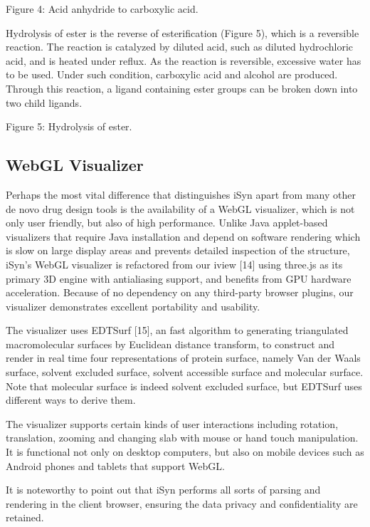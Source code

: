 Figure 4: Acid anhydride to carboxylic acid.

Hydrolysis of ester is the reverse of esterification (Figure 5), which is a reversible reaction. The reaction is catalyzed by diluted acid, such as diluted hydrochloric acid, and is heated under reflux. As the reaction is reversible, excessive water has to be used. Under such condition, carboxylic acid and alcohol are produced. Through this reaction, a ligand containing ester groups can be broken down into two child ligands.

Figure 5: Hydrolysis of ester.

\subsection{WebGL Visualizer}

Perhaps the most vital difference that distinguishes iSyn apart from many other de novo drug design tools is the availability of a WebGL visualizer, which is not only user friendly, but also of high performance. Unlike Java applet-based visualizers that require Java installation and depend on software rendering which is slow on large display areas and prevents detailed inspection of the structure, iSyn’s WebGL visualizer is refactored from our iview [14] using three.js as its primary 3D engine with antialiasing support, and benefits from GPU hardware acceleration. Because of no dependency on any third-party browser plugins, our visualizer demonstrates excellent portability and usability.

The visualizer uses EDTSurf [15], an fast algorithm to generating triangulated macromolecular surfaces by Euclidean distance transform, to construct and render in real time four representations of protein surface, namely Van der Waals surface, solvent excluded surface, solvent accessible surface and molecular surface. Note that molecular surface is indeed solvent excluded surface, but EDTSurf uses different ways to derive them.

The visualizer supports certain kinds of user interactions including rotation, translation, zooming and changing slab with mouse or hand touch manipulation. It is functional not only on desktop computers, but also on mobile devices such as Android phones and tablets that support WebGL.

It is noteworthy to point out that iSyn performs all sorts of parsing and rendering in the client browser, ensuring the data privacy and confidentiality are retained.

